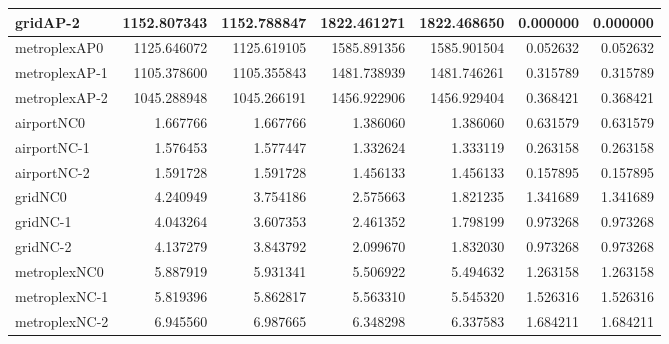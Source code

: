 \begin{longtable}{|l|r|r|r|r|r|r|}
gridAP-2 & 1152.807343 & 1152.788847 & 1822.461271 & 1822.468650 & 0.000000 & 0.000000 \\ \hline
metroplexAP0 & 1125.646072 & 1125.619105 & 1585.891356 & 1585.901504 & 0.052632 & 0.052632 \\ \hline
metroplexAP-1 & 1105.378600 & 1105.355843 & 1481.738939 & 1481.746261 & 0.315789 & 0.315789 \\ \hline
metroplexAP-2 & 1045.288948 & 1045.266191 & 1456.922906 & 1456.929404 & 0.368421 & 0.368421 \\ \hline
airportNC0 & 1.667766 & 1.667766 & 1.386060 & 1.386060 & 0.631579 & 0.631579 \\ \hline
airportNC-1 & 1.576453 & 1.577447 & 1.332624 & 1.333119 & 0.263158 & 0.263158 \\ \hline
airportNC-2 & 1.591728 & 1.591728 & 1.456133 & 1.456133 & 0.157895 & 0.157895 \\ \hline
gridNC0 & 4.240949 & 3.754186 & 2.575663 & 1.821235 & 1.341689 & 1.341689 \\ \hline
gridNC-1 & 4.043264 & 3.607353 & 2.461352 & 1.798199 & 0.973268 & 0.973268 \\ \hline
gridNC-2 & 4.137279 & 3.843792 & 2.099670 & 1.832030 & 0.973268 & 0.973268 \\ \hline
metroplexNC0 & 5.887919 & 5.931341 & 5.506922 & 5.494632 & 1.263158 & 1.263158 \\ \hline
metroplexNC-1 & 5.819396 & 5.862817 & 5.563310 & 5.545320 & 1.526316 & 1.526316 \\ \hline
metroplexNC-2 & 6.945560 & 6.987665 & 6.348298 & 6.337583 & 1.684211 & 1.684211 \\ \hline
\end{longtable}
